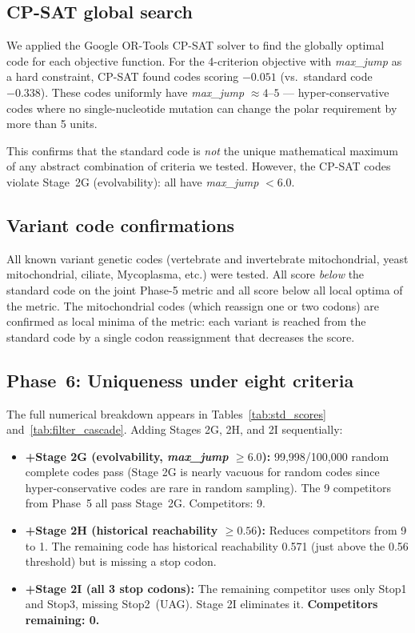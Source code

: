 \documentclass[10pt,twocolumn]{article}
\begin{document}
\subsection{CP-SAT global search}

We applied the Google OR-Tools CP-SAT solver to find the globally optimal code
for each objective function. For the 4-criterion objective with \emph{max\_jump}
as a hard constraint, CP-SAT found codes scoring $-0.051$ (vs.\ standard code
$-0.338$). These codes uniformly have \emph{max\_jump} $\approx 4$--$5$ ---
hyper-conservative codes where no single-nucleotide mutation can change the
polar requirement by more than 5 units.

This confirms that the standard code is \emph{not} the unique mathematical
maximum of any abstract combination of criteria we tested. However, the
CP-SAT codes violate Stage~2G (evolvability): all have \emph{max\_jump} $< 6.0$.

\subsection{Variant code confirmations}

All known variant genetic codes (vertebrate and invertebrate mitochondrial,
yeast mitochondrial, ciliate, Mycoplasma, etc.) were tested. All score
\emph{below} the standard code on the joint Phase-5 metric and all score
below all local optima of the metric. The mitochondrial codes (which reassign
one or two codons) are confirmed as local minima of the metric: each variant
is reached from the standard code by a single codon reassignment that
decreases the score.

\subsection{Phase~6: Uniqueness under eight criteria}

The full numerical breakdown appears in Tables~\ref{tab:std_scores}
and~\ref{tab:filter_cascade}.
Adding Stages 2G, 2H, and 2I sequentially:

\begin{itemize}[leftmargin=1.5em,itemsep=2pt]
\item \textbf{+Stage 2G (evolvability, \emph{max\_jump} $\geq 6.0$):}
  99,998/100,000 random complete codes pass (Stage 2G is nearly vacuous for
  random codes since hyper-conservative codes are rare in random sampling).
  The 9 competitors from Phase~5 all pass Stage~2G. Competitors: 9.

\item \textbf{+Stage 2H (historical reachability $\geq 0.56$):}
  Reduces competitors from 9 to 1. The remaining code has historical
  reachability 0.571 (just above the 0.56 threshold) but is missing a
  stop codon.

\item \textbf{+Stage 2I (all 3 stop codons):}
  The remaining competitor uses only Stop1 and Stop3, missing Stop2~(UAG).
  Stage 2I eliminates it. \textbf{Competitors remaining: 0.}
\end{itemize}
\end{document}
